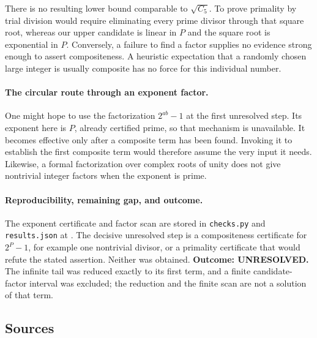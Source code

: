 \documentclass[11pt,a4paper]{article}
\begin{document}
There is no resulting lower bound comparable to $\sqrt{C_5}$.
To prove primality by trial division would require eliminating every
prime divisor through that square root, whereas our upper candidate
is linear in $P$ and the square root is exponential in $P$. Conversely,
a failure to find a factor supplies no evidence strong enough to assert
compositeness. A heuristic expectation that a randomly chosen large
integer is usually composite has no force for this individual number.

\paragraph{The circular route through an exponent factor.}
One might hope to use the factorization $2^{ab}-1$ at the first
unresolved step. Its exponent here is $P$, already certified prime,
so that mechanism is unavailable. It becomes effective only after a
composite term has been found. Invoking it to establish the first
composite term would therefore assume the very input it needs.
Likewise, a formal factorization over complex roots of unity does not
give nontrivial integer factors when the exponent is prime.

\paragraph{Reproducibility, remaining gap, and outcome.}
The exponent certificate and factor scan are stored in
\texttt{checks.py} and \texttt{results.json} at
.
The decisive unresolved step is a compositeness certificate for
$2^P-1$, for example one nontrivial divisor, or a primality certificate
that would refute the stated assertion. Neither was obtained.
\textbf{Outcome: UNRESOLVED.} The infinite tail was reduced exactly to
its first term, and a finite candidate-factor interval was excluded;
the reduction and the finite scan are not a solution of that term.

\subsection{Sources}
\end{document}
